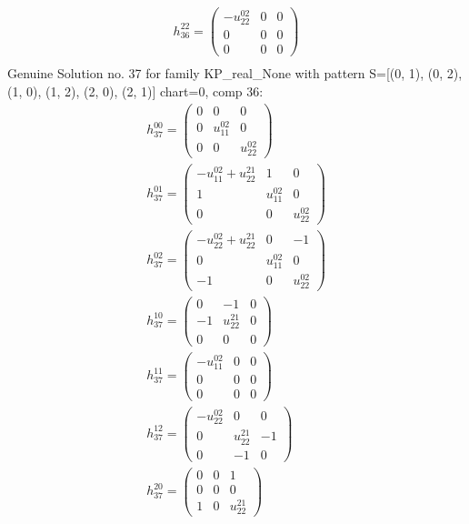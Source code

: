 \documentclass[a4paper, 11pt, twoside, onecolumn]{article}
\begin{document}
\begin{landscape}
\begin{gather*}
	 h_{36}^{22}=\begin{pmatrix}- u^{02}_{22} & 0 & 0\\0 & 0 & 0\\0 & 0 & 0\end{pmatrix}\\ 
\end{gather*} 
Genuine Solution no. 37 for family KP_real_None with pattern S=[(0, 1), (0, 2), (1, 0), (1, 2), (2, 0), (2, 1)] chart=0, comp 36: 
\begin{gather*} 
	 h_{37}^{00}=\begin{pmatrix}0 & 0 & 0\\0 & u^{02}_{11} & 0\\0 & 0 & u^{02}_{22}\end{pmatrix}\\ 
	 h_{37}^{01}=\begin{pmatrix}- u^{02}_{11} + u^{21}_{22} & 1 & 0\\1 & u^{02}_{11} & 0\\0 & 0 & u^{02}_{22}\end{pmatrix}\\ 
	 h_{37}^{02}=\begin{pmatrix}- u^{02}_{22} + u^{21}_{22} & 0 & -1\\0 & u^{02}_{11} & 0\\-1 & 0 & u^{02}_{22}\end{pmatrix}\\ 
	 h_{37}^{10}=\begin{pmatrix}0 & -1 & 0\\-1 & u^{21}_{22} & 0\\0 & 0 & 0\end{pmatrix}\\ 
	 h_{37}^{11}=\begin{pmatrix}- u^{02}_{11} & 0 & 0\\0 & 0 & 0\\0 & 0 & 0\end{pmatrix}\\ 
	 h_{37}^{12}=\begin{pmatrix}- u^{02}_{22} & 0 & 0\\0 & u^{21}_{22} & -1\\0 & -1 & 0\end{pmatrix}\\ 
	 h_{37}^{20}=\begin{pmatrix}0 & 0 & 1\\0 & 0 & 0\\1 & 0 & u^{21}_{22}\end{pmatrix}\\ 

\end{gather*}
\end{landscape}
\end{document}
